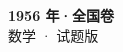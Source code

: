 \documentclass[zihao=-4, a4paper]{ctexart}
\begin{document}
\begin{center}
  {\Large\bfseries 1956 年·全国卷}\\[4pt]
  {\large 数学 · 试题版}
\end{center}
\medskip
{}

\end{document}
